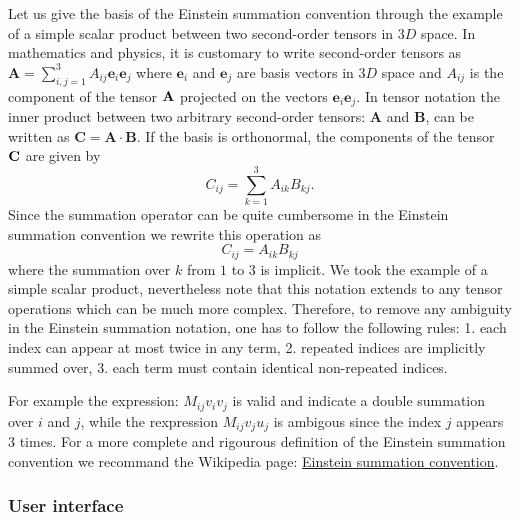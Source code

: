 Let us give the basis of the Einstein summation convention through the example of a simple scalar product between two second-order tensors in $3D$ space. In mathematics and physics, it is customary to write second-order tensors as $\textbf{A} = \sum_{i,j = 1}^3 A_{ij} \bm e_i\bm e_j$ where $\bm e_i$ and $\bm e_j$ are basis vectors in $3D$ space and $A_{ij}$ is the component of the tensor $\textbf A$ projected on the vectors $\bm e_i\bm e_j$. In tensor notation the inner product between two arbitrary second-order tensors: $\textbf{A}$ and $\textbf{B}$, can be written as $\textbf{C} =  \textbf{A}\cdot\textbf{B}$. If the basis is orthonormal, the components of the tensor $\textbf C$ are given by
$$ C_{ij} = \sum_{k=1}^3 A_{ik} B_{kj}.$$
Since the summation operator can be quite cumbersome in the Einstein summation convention we rewrite this operation as
$$ C_{ij} = A_{ik} B_{kj} $$
where the summation over $k$ from $1$ to $3$ is implicit.
We took the example of a simple scalar product, nevertheless note that this notation extends to any tensor operations which can be much more complex.   
Therefore, to remove any ambiguity in the Einstein summation notation, one has to follow the following rules:
1. each index can appear at most twice in any term,
2. repeated indices are implicitly summed over,
3. each term must contain identical non-repeated indices.

For example the expression: $M_{ij}v_iv_j$ is valid and indicate a double summation over $i$ and $j$, 
while the rexpression $M_{ij}v_ju_j$ is ambigous since the index $j$ appears $3$ times. 
For a more complete and rigourous definition of the Einstein summation convention we recommand the Wikipedia page: \href{https://en.wikipedia.org/wiki/Einstein\_notation}{Einstein summation convention}.

\subsubsection{ User interface}

